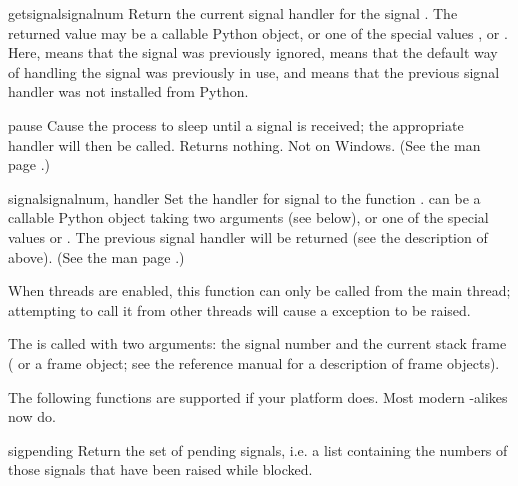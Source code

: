 \begin{funcdesc}{getsignal}{signalnum}
  Return the current signal handler for the signal .
  The returned value may be a callable Python object, or one of the
  special values ,  or
  .  Here,  means that the
  signal was previously ignored,  means that the
  default way of handling the signal was previously in use, and
   means that the previous signal handler was not installed
  from Python.
\end{funcdesc}

\begin{funcdesc}{pause}{}
  Cause the process to sleep until a signal is received; the
  appropriate handler will then be called.  Returns nothing.  Not on
  Windows. (See the \UNIX{} man page .)
\end{funcdesc}

\begin{funcdesc}{signal}{signalnum, handler}
  Set the handler for signal  to the function
  .   can be a callable Python object
  taking two arguments (see below), or
  one of the special values  or
  .  The previous signal handler will be returned
  (see the description of  above).  (See the
  \UNIX{} man page .)

  When threads are enabled, this function can only be called from the
  main thread; attempting to call it from other threads will cause a
   exception to be raised.

  The  is called with two arguments: the signal number
  and the current stack frame ( or a frame object; see the
  reference manual for a description of frame objects).
\end{funcdesc}

The following functions are supported if your platform does.  Most
modern \UNIX-alikes now do.

\begin{funcdesc}{sigpending}{}
  Return the set of pending signals, i.e. a list containing the
  numbers of those signals that have been raised while blocked.
\end{funcdesc}

